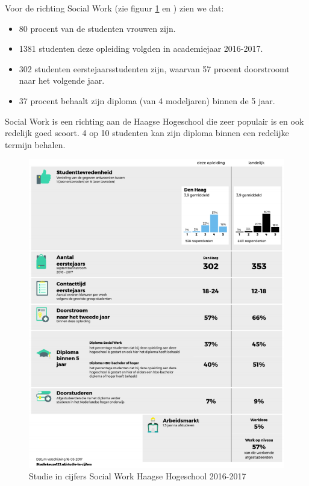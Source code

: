 Voor de richting Social Work (zie figuur \ref{fig:socialwork} en \textcite{Studiekeuze2017}) zien we dat:
\begin{itemize}
	\item 80 procent van de studenten vrouwen zijn.
	\item 1381 studenten deze opleiding volgden in academiejaar 2016-2017.
	\item 302 studenten eerstejaarsstudenten zijn, waarvan 57 procent doorstroomt naar het volgende jaar.
	\item 37 procent behaalt zijn diploma (van 4 modeljaren) binnen de 5 jaar.
\end{itemize}

Social Work is een richting aan de Haagse Hogeschool die zeer populair is en ook redelijk goed scoort. 4 op 10 studenten kan zijn diploma binnen een redelijke termijn behalen. 

\begin{figure}
	\includegraphics[width=\textwidth]
	{img/socialwork.png}
	\caption{Studie in cijfers Social Work Haagse Hogeschool 2016-2017}
	\label{fig:socialwork}
\end{figure}

